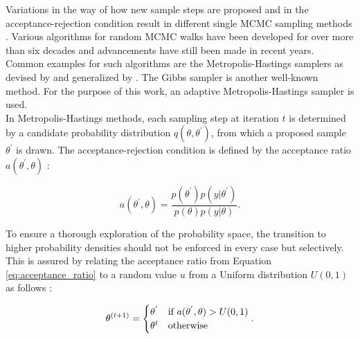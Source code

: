         Variations in the way of how new  sample steps are proposed and in the acceptance-rejection condition result in different single MCMC sampling methods \citep{schaaf2017, delaVarga2016}. Various algorithms for random MCMC walks have been developed for over more than six decades and advancements have still been made in recent years. Common examples for such algorithms are the Metropolis-Hastings samplers as devised by \citet{metropolis1953equation} and generalized by \citet{hastings1970}. The Gibbs sampler \citep{geman1984stochastic} is another well-known method. 
        For the purpose of this work, an adaptive Metropolis-Hastings sampler is used.\\
        In Metropolis-Hastings methods, each sampling step at iteration $t$ is determined by a candidate probability distribution $q(\theta,\theta^{'})$, from which a proposed sample $\theta^{'}$ is drawn. The acceptance-rejection condition is defined by the acceptance ratio $a(\theta^{'},\theta)$ \citep{haario2001adaptive}:
        
        \begin{equation}\label{eq:acceptance_ratio}
        a(\theta^{'},\theta)=\frac{p(\theta^{'})p(y|\theta^{'})}{p(\theta)p(y|\theta)}.
        \end{equation}
        
        To ensure a thorough exploration of the probability space, the transition to higher probability densities should not be enforced in every case but selectively. This is assured by relating the acceptance ratio from Equation \ref{eq:acceptance_ratio} to a random value $u$ from a Uniform distribution $U(0,1)$ as follows \citep{delaVarga2016}:
        
        \begin{equation}\label{eq:transition_selectivity}
        \theta^{(t+1)}=\begin{cases}
        \theta^{'} & $if $ a(\theta^{'},\theta)>U(0,1)\\
        \theta^{t} & $otherwise$\\
        \end{cases}.
        \end{equation}
        

